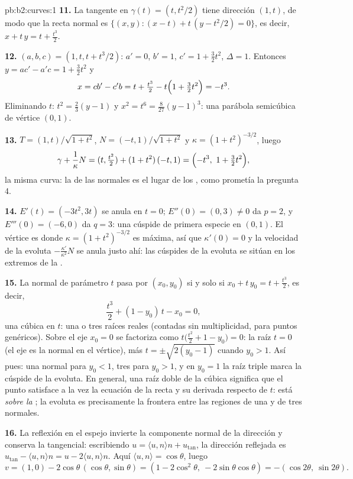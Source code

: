 \begin{solution}{pb:b2:curves:1}
\textbf{11.} La tangente en $\gamma(t) = (t, t^2/2)$ tiene dirección
$(1, t)$, de modo que la recta normal es $\{(x, y) : (x - t) + t\,(y
- t^2/2) = 0\}$, es decir, $x + t\,y = t + \tfrac{t^3}2$.

\textbf{12.} $(a, b, c) = (1, t, t + t^3/2)$: $a' = 0$, $b' = 1$, $c'
= 1 + \tfrac32 t^2$, $\Delta = 1$. Entonces $y = ac' - a'c = 1 +
\tfrac32t^2$ y
\[
x = cb' - c'b = t + \tfrac{t^3}2 - t\Bigl(1 +
\tfrac32t^2\Bigr) = -t^3 .
\]
Eliminando $t$: $t^2 = \tfrac23(y - 1)$ y $x^2 = t^6 = \tfrac8{27}(y
- 1)^3$: una parábola semicúbica de vértice $(0, 1)$.

\textbf{13.} $T = (1, t)/\sqrt{1+t^2}$, $N = (-t, 1)/\sqrt{1+t^2}$ y
$\kappa = (1+t^2)^{-3/2}$, luego
\[
\gamma + \frac1\kappa N = (t, \tfrac{t^2}2) +
(1+t^2)\,(-t, 1) = \Bigl(-t^3,\ 1 + \tfrac32t^2\Bigr),
\]
la misma curva: la  de las normales es el lugar de los
, como prometía la pregunta 4.

\textbf{14.} $E'(t) = (-3t^2, 3t)$ se anula en $t = 0$; $E''(0) = (0,
3) \neq 0$ da $p = 2$, y $E'''(0) = (-6, 0)$ da $q = 3$: una cúspide
de primera especie en $(0, 1)$. El vértice es donde $\kappa =
(1+t^2)^{-3/2}$ es máxima, así que $\kappa'(0) = 0$ y la velocidad de
la evoluta $-\frac{\kappa'}{\kappa^2}N$ se anula justo ahí: las
cúspides de la evoluta se sitúan en los extremos de la .

\textbf{15.} La normal de parámetro $t$ pasa por $(x_0, y_0)$ si y
solo si $x_0 + t\,y_0 = t + \tfrac{t^3}2$, es decir,
\[
\frac{t^3}2 + (1 - y_0)\,t - x_0 = 0 ,
\]
una cúbica en $t$: una o tres raíces reales (contadas sin
multiplicidad, para puntos genéricos). Sobre el eje $x_0 = 0$ se
factoriza como $t\bigl(\tfrac{t^2}2 + 1 - y_0\bigr) = 0$: la raíz $t
= 0$ (el eje es la normal en el vértice), más $t = \pm\sqrt{2(y_0 -
1)}$ cuando $y_0 > 1$. Así pues: una normal para $y_0 < 1$, tres para
$y_0 > 1$, y en $y_0 = 1$ la raíz triple marca la cúspide de la
evoluta. En general, una raíz doble de la cúbica significa que el
punto satisface a la vez la ecuación de la recta y su derivada
respecto de $t$: está \emph{sobre la }; la evoluta es
precisamente la frontera entre las regiones de una y de tres
normales.

\textbf{16.} La reflexión en el espejo invierte la componente normal
de la dirección y conserva la tangencial: escribiendo $u = \langle u,
n\rangle n + u_{\mathrm{tan}}$, la dirección reflejada es
$u_{\mathrm{tan}} - \langle u, n\rangle n = u - 2\langle u, n\rangle
n$. Aquí $\langle u, n\rangle = \cos\theta$, luego
\[
v = (1, 0) - 2\cos\theta\,(\cos\theta, \sin\theta)
= (1 - 2\cos^2\theta,\ -2\sin\theta\cos\theta)
= -(\cos2\theta,\ \sin2\theta).
\]


\end{solution}
